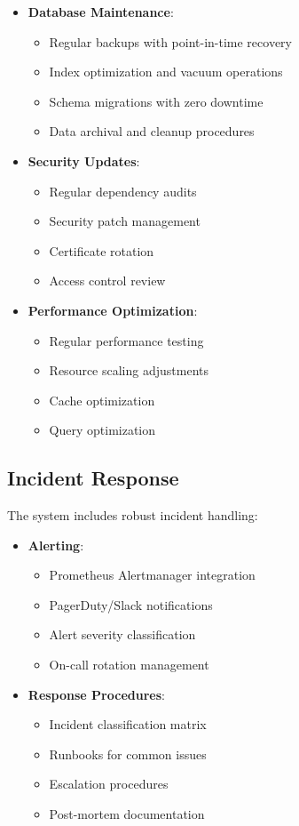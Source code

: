 \begin{itemize}
    \item \textbf{Database Maintenance}:
    \begin{itemize}
        \item Regular backups with point-in-time recovery
        \item Index optimization and vacuum operations
        \item Schema migrations with zero downtime
        \item Data archival and cleanup procedures
    \end{itemize}

    \item \textbf{Security Updates}:
    \begin{itemize}
        \item Regular dependency audits
        \item Security patch management
        \item Certificate rotation
        \item Access control review
    \end{itemize}

    \item \textbf{Performance Optimization}:
    \begin{itemize}
        \item Regular performance testing
        \item Resource scaling adjustments
        \item Cache optimization
        \item Query optimization
    \end{itemize}
\end{itemize}

\subsection{Incident Response}

The system includes robust incident handling:

\begin{itemize}
    \item \textbf{Alerting}:
    \begin{itemize}
        \item Prometheus Alertmanager integration
        \item PagerDuty/Slack notifications
        \item Alert severity classification
        \item On-call rotation management
    \end{itemize}

    \item \textbf{Response Procedures}:
    \begin{itemize}
        \item Incident classification matrix
        \item Runbooks for common issues
        \item Escalation procedures
        \item Post-mortem documentation
    \end{itemize}
\end{itemize}
